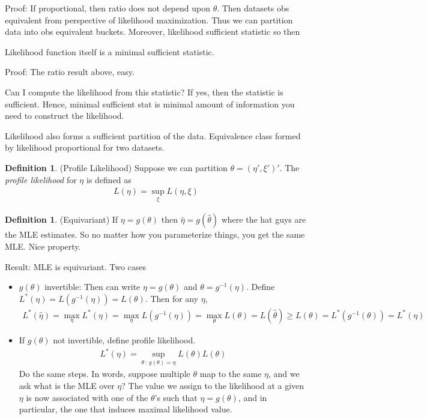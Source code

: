 \documentclass[12pt]{article}
\theoremstyle{plain}
\theoremstyle{definition}
\newtheorem{defn}[thm]{Definition}
\theoremstyle{remark}
\begin{document}
Proof:
If proportional, then ratio does not depend upon $\theta$.
Then datasets obs equivalent from perspective of likelihood
maximization.
Thus we can partition data into obs equivalent buckets.
Moreover, likelihood sufficient statistic so then

Likelihood function itself is a minimal sufficient statistic.

Proof:
The ratio result above, easy.

Can I compute the likelihood from this statistic? If yes, then the
statistic is sufficient.
Hence, minimal sufficient stat is minimal amount of information you need
to construct the likelihood.


Likelihood also forms a sufficient partition of the data.
Equivalence class formed by likelihood proportional for two datasets.


\begin{defn}
(Profile Likelihood)
Suppose we can partition $\theta=(\eta',\xi')'$.
The \emph{profile likelihood} for $\eta$ is defined as
\begin{align*}
  L(\eta) = \sup_\xi L(\eta,\xi)
\end{align*}
\end{defn}

\begin{defn}(Equivariant)
If $\eta=g(\theta)$ then $\hat{\eta}=g(\hat{\theta})$ where the hat
guys are the MLE estimates.
So no matter how you parameterize things, you get the same MLE. Nice
property.
\end{defn}


Result: MLE is equivariant.
Two cases
\begin{itemize}
  \item $g(\theta)$ invertible:
    Then can write $\eta=g(\theta)$ and $\theta=g^{-1}(\eta)$.
    Define $L^*(\eta)=L(g^{-1}(\eta))=L(\theta)$.
    Then for any $\eta$,
    \begin{align*}
      L^*(\hat{\eta})
      =
      \max_\eta
      L^*(\eta)
      =
      \max_\eta
      L(g^{-1}(\eta))
      =
      \max_\theta
      L(\theta)
      =
      L(\hat{\theta})
      \geq
      L(\theta)
      =
      L^*(g^{-1}(\theta))
      =
      L^*(\eta)
    \end{align*}
  \item If $g(\theta)$ not invertible, define
    profile likelihood.
    \begin{align*}
      L^*(\eta) =
      \sup_{\theta\,:\,g(\theta)=\eta}
      L(\theta)
      L(\theta)
    \end{align*}
    Do the same steps.
    In words, suppose multiple $\theta$ map to the same $\eta$, and we
    ask what is the MLE over $\eta$?
    The value we assign to the likelihood at a given $\eta$ is now
    associated with one of the $\theta$'s such that $\eta=g(\theta)$,
    and in particular, the one that induces maximal likelihood value.
\end{itemize}
\end{document}

